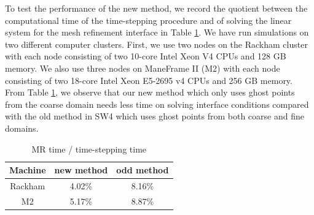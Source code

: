To test the performance of the new method, we record the quotient between the computational time of the time-stepping procedure and of solving the linear system for the mesh refinement interface in Table \ref{time}. We have run simulations on two different computer clusters. First, we use two nodes on the Rackham cluster with each node consisting of two 10-core Intel Xeon V4 CPUs and 128 GB memory. We also use three nodes on ManeFrame II (M2) with each node consisting of two 18-core Intel Xeon E5-2695 v4 CPUs and 256 GB memory. From Table \ref{time}, we observe that our new method which only uses ghost points from the coarse domain needs less time on solving interface conditions compared with the old method in SW4 which uses ghost points from both coarse and fine domains.

\begin{table}[htbp]
	\begin{center}
		\begin{tabular}{|c|c|c|}
			\hline
			Machine   & new method & odd method \\
			\hline
			Rackham & 4.02\% &  8.16\%\\
			\hline
			M2 &5.17\% & 8.87\%\\
			\hline 
		\end{tabular}
	\end{center}
		\caption{MR time / time-stepping time}\label{time}
\end{table} 


